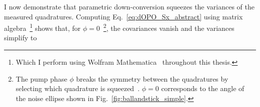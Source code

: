 I now demonstrate that parametric down-conversion squeezes the variances of the measured quadratures.
Computing Eq.~\ref{eq:dOPO_Sx_abstract} using matrix algebra~\footnote{Which I perform using Wolfram Mathematica~\cite{} throughout this thesis.} shows that, for $\phi=0$~\footnote{The pump phase $\phi$ breaks the symmetry between the quadratures by selecting which quadrature is squeezed~\cite{}. $\phi=0$ corresponds to the angle of the noise ellipse shown in Fig.~\ref{fig:ballandstick_simple}.}, the covariances vanish and the variances simplify to~\cite{} 
